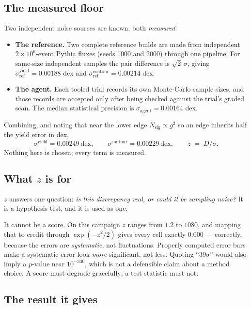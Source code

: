 \documentclass[11pt]{article}
\newcommand{\Nsig}{N_{\mathrm{sig}}}
\begin{document}
\subsection{The measured floor}

Two independent noise sources are known, both \emph{measured}:

\begin{itemize}
\item \textbf{The reference.} Two complete reference builds are made from
  independent $2\times10^6$-event Pythia fluxes (seeds 1000 and 2000) through
  one pipeline. For same-size independent samples the pair difference is
  $\sqrt2\,\sigma$, giving
  $\sigma_{\mathrm{ref}}^{\mathrm{yield}}=0.00188$ dex and
  $\sigma_{\mathrm{ref}}^{\mathrm{contour}}=0.00214$ dex.
\item \textbf{The agent.} Each tooled trial records its own Monte-Carlo sample
  sizes, and those records are accepted only after being checked against the
  trial's graded scan. The median statistical precision is
  $\sigma_{\mathrm{agent}}=0.00164$ dex.
\end{itemize}

Combining, and noting that near the lower edge $\Nsig\propto g^2$ so an edge
inherits half the yield error in dex,
\begin{equation}
  \sigma^{\mathrm{yield}} = 0.00249~\text{dex},\qquad
  \sigma^{\mathrm{contour}} = 0.00229~\text{dex},\qquad
  z \;=\; D/\sigma .
\end{equation}
Nothing here is chosen; every term is measured.

\subsection{What $z$ is for}

$z$ answers one question: \emph{is this discrepancy real, or could it be
sampling noise?} It is a hypothesis test, and it is used as one.

It cannot be a score. On this campaign $z$ ranges from $1.2$ to $1080$, and
mapping that to credit through $\exp(-z^2/2)$ gives every cell exactly $0.000$
--- correctly, because the errors are \emph{systematic}, not fluctuations.
Properly computed error bars make a systematic error look \emph{more}
significant, not less. Quoting ``$39\sigma$'' would also imply a $p$-value near
$10^{-330}$, which is not a defensible claim about a method choice. A score must
degrade gracefully; a test statistic must not.

\subsection{The result it gives}
\end{document}
